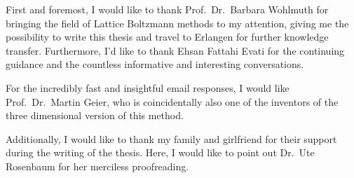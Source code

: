 
First and foremost, I would like to thank Prof.\ Dr.\ Barbara Wohlmuth for bringing the field of Lattice Boltzmann methods to my attention, giving me the possibility to write this thesis and travel to Erlangen for further knowledge transfer.
Furthermore, I'd like to thank Ehsan Fattahi Evati for the continuing guidance and the countless informative and interesting conversations.

For the incredibly fast and insightful email responses, I would like Prof.\ Dr.\ Martin Geier, who is coincidentally also one of the inventors of the three dimensional version of this method.

Additionally, I would like to thank my family and girlfriend for their support during the writing of the thesis.
Here, I would like to point out Dr.\ Ute Rosenbaum for her merciless proofreading.
